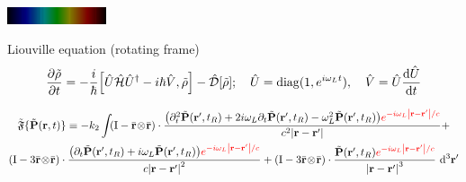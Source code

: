 \documentclass[aspectratio=169]{beamer}
\newcommand{\oper}[1]{\mathcal{#1}}
\newcommand{\outerprod}[2]{#1 \! \otimes \! #2}
\begin{document}
\begin{frame}
  \includegraphics[width=\textwidth, height=0.5cm]{figures/Helium_spectrum_visible}
      \begin{block}{Liouville equation (rotating frame)}
        \begin{gather*}
          \pdv{\tilde{\rho}}{t} = -\frac{i}{\hbar} \commutator{\hat{U}\hat{\oper{H}}\hat{U}^\dagger - i\hbar \hat{V}}{\tilde{\rho}} - \hat{\oper{D}}\qty[\tilde{\rho}]; \quad \hat{U} = \mathrm{diag}(1, e^{i \omega_L t}), \quad \hat{V} = \hat{U} \dv{\hat{U}}{t}
        \end{gather*}
      \end{block}

      \begin{gather*}
        \tilde{\mathfrak{F}}\{ \tilde{\vb{P}}(\vb{r}, t) \} \equiv -k_2 \int_{}
        \qty(\mathrm{I} -  \outerprod{\bar{\vb{r}}}{\bar{\vb{r}}} ) \cdot \frac{\qty(\partial_t^2 \tilde{\vb{P}}(\vb{r}', t_R) + 2 i \omega_L \partial_t \tilde{\vb{P}}(\vb{r}', t_R) - \omega_L^2 \tilde{\vb{P}}(\vb{r}', t_R)) \textcolor{red}{e^{-i \omega_L \abs{\vb{r} - \vb{r}'}/c}}}{c^2 \abs{\vb{r}-\vb{r}'}} + \\
        \qty(\mathrm{I} - 3\outerprod{\bar{\vb{r}}}{\bar{\vb{r}}} ) \cdot \frac{\qty(\partial_t \tilde{\vb{P}}(\vb{r}', t_R) + i \omega_L \tilde{\vb{P}}(\vb{r}', t_R))\textcolor{red}{e^{-i \omega_L \abs{\vb{r} - \vb{r}'}/c}}}{c \abs{\vb{r}-\vb{r}'}^2} +
        \qty(\mathrm{I} - 3\outerprod{\bar{\vb{r}}}{\bar{\vb{r}}} ) \cdot \frac{                \tilde{\vb{P}}(\vb{r}', t_R) \textcolor{red}{e^{-i \omega_L \abs{\vb{r} - \vb{r}'}/c}}}{\abs{\vb{r}-\vb{r}'}^3}
        \, \dd[3]{\vb{r'}}
      \end{gather*}
\end{frame}

\begin{frame}
  
\end{frame}
\end{document}

